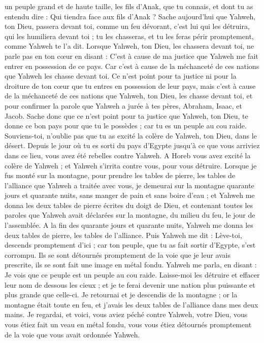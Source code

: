 \begin{multicols}{2}
un peuple grand et de haute taille, les fils d’Anak, que tu connais, et dont tu as entendu dire : Qui tiendra face aux fils d’Anak ?
Sache aujourd'hui que Yahweh, ton Dieu, passera devant toi, comme un feu dévorant, c'est lui qui les détruira, qui les humiliera devant toi ; tu les chasseras, et tu les feras périr promptement, comme Yahweh te l'a dit.
Lorsque Yahweh, ton Dieu, les chassera devant toi, ne parle pas en ton cœur en disant : C'est à cause de ma justice que Yahweh me fait entrer en possession de ce pays. Car c'est à cause de la méchanceté de ces nations que Yahweh les chasse devant toi.
Ce n'est point pour ta justice ni pour la droiture de ton cœur que tu entres en possession de leur pays, mais c'est à cause de la méchanceté de ces nations que Yahweh, ton Dieu, les chasse devant toi, et pour confirmer la parole que Yahweh a jurée à tes pères, Abraham, Isaac, et Jacob.
Sache donc que ce n'est point pour ta justice que Yahweh, ton Dieu, te donne ce bon pays pour que tu le possèdes ; car tu es un peuple au cou raide.
Souviens-toi, n'oublie pas que tu as excité la colère de Yahweh, ton Dieu, dans le désert. Depuis le jour où tu es sorti du pays d'Egypte jusqu'à ce que vous arriviez dans ce lieu, vous avez été rebelles contre Yahweh.
A Horeb vous avez excité la colère de Yahweh ; et Yahweh s’irrita contre vous, pour vous détruire.
Lorsque je fus monté sur la montagne, pour prendre les tables de pierre, les tables de l'alliance que Yahweh a traitée avec vous, je demeurai sur la montagne quarante jours et quarante nuits, sans manger de pain et sans boire d'eau ;
et Yahweh me donna les deux tables de pierre écrites du doigt de Dieu, et contenant toutes les paroles que Yahweh avait déclarées sur la montagne, du milieu du feu, le jour de l'assemblée.
A la fin des quarante jours et quarante nuits, Yahweh me donna les deux tables de pierre, les tables de l'alliance.
Puis Yahweh me dit : Lève-toi, descends promptement d'ici ; car ton peuple, que tu as fait sortir d'Egypte, s'est corrompu. Ils se sont détournés promptement de la voie que je leur avais prescrite, ils se sont fait une image en métal fondu.
Yahweh me parla, en disant : Je vois que ce peuple est un peuple au cou raide.
Laisse-moi les détruire et effacer leur nom de dessous les cieux ; et je te ferai devenir une nation plus puissante et plus grande que celle-ci.
Je retournai et je descendis de la montagne ; or la montagne était toute en feu, et j’avais les deux tables de l'alliance dans mes deux mains.
Je regardai, et voici, vous aviez péché contre Yahweh, votre Dieu, vous vous étiez fait un veau en métal fondu, vous vous étiez détournés promptement de la voie que vous avait ordonnée Yahweh.

\end{multicols}
